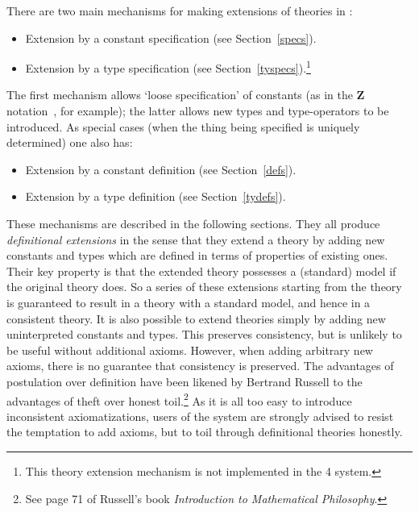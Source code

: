 There are two main mechanisms for making extensions of theories in \HOL:
\begin{itemize}

\item Extension by a constant specification   (see Section~\ref{specs}).

\item Extension by a type specification (see
Section~\ref{tyspecs}).\footnote{This theory extension mechanism is
not implemented in the \HOL{}4 system.}

\end{itemize}
The first mechanism allows `loose specification' of constants (as in
the {\bf Z} notation~\cite{Z}, for example); the latter allows new
types and type-operators to be introduced.  As special cases (when the
thing being specified is uniquely determined) one also has:
\begin{itemize}

\item Extension by a constant definition (see Section~\ref{defs}).

\item Extension by a type definition (see Section~\ref{tydefs}).

\end{itemize}
These mechanisms are described in the following sections. They all
produce {\it definitional extensions\/} in the sense that they extend
a theory by adding new constants and types which are defined in terms
of properties of existing ones. Their key property is that the
extended theory possesses a (standard) model if the original theory
does. So a series of these extensions starting from the theory
 is guaranteed to result in a theory with a standard
model, and hence in a consistent theory. It is also possible to extend
theories simply by adding new uninterpreted constants and types. This
preserves consistency, but is unlikely to be useful without additional
axioms. However, when adding arbitrary new
axioms, there is no guarantee
that consistency is preserved. The advantages of postulation over
definition have been likened by Bertrand Russell to the advantages of
theft over honest toil.\footnote{See page 71 of Russell's book {\sl
Introduction to Mathematical Philosophy\/}.} As it is all too easy to
introduce inconsistent axiomatizations, users of the \HOL{} system are
strongly advised to resist the temptation to add axioms, but to toil
through definitional theories honestly.





